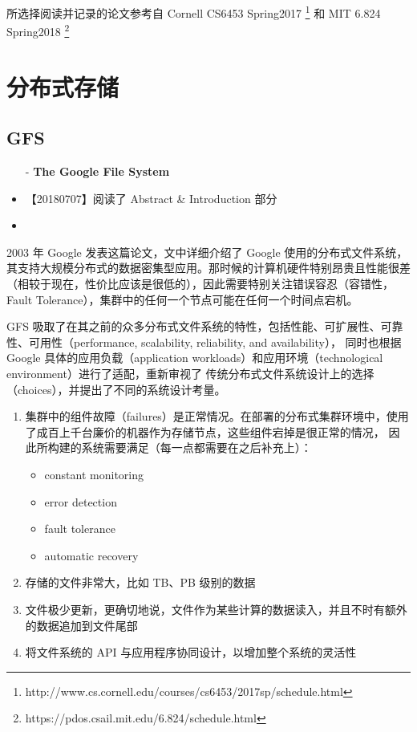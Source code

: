所选择阅读并记录的论文参考自 Cornell CS6453 Spring2017%
\footnote{http://www.cs.cornell.edu/courses/cs6453/2017sp/schedule.html}%
和 MIT 6.824 Spring2018%
\footnote{https://pdos.csail.mit.edu/6.824/schedule.html}%

%
%


\section{分布式存储}\label{sec:papers:storage}

\subsection{GFS}\label{paper:gfs}

\begin{itemize}
	\item [-] \textbf{The Google File System}
\end{itemize}

\begin{itemize}
	\item 【20180707】阅读了 Abstract \& Introduction 部分
	\item 
\end{itemize}

2003 年 Google 发表这篇论文，文中详细介绍了 Google 使用的分布式文件系统，其支持大规模分布式的数据密集型应用。那时候的计算机硬件特别昂贵且性能很差
（相较于现在，性价比应该是很低的），因此需要特别关注错误容忍（容错性，Fault Tolerance），集群中的任何一个节点可能在任何一个时间点宕机。

GFS 吸取了在其之前的众多分布式文件系统的特性，包括性能、可扩展性、可靠性、可用性（performance, scalability, reliability, and availability），
同时也根据 Google 具体的应用负载（application workloads）和应用环境（technological environment）进行了适配，重新审视了
传统分布式文件系统设计上的选择（choices），并提出了不同的系统设计考量。
\begin{enumerate}
	\item 集群中的组件故障（failures）是正常情况。在部署的分布式集群环境中，使用了成百上千台廉价的机器作为存储节点，这些组件宕掉是很正常的情况，
	因此所构建的系统需要满足（每一点都需要在之后补充上）： %
	\begin{itemize}
		\item constant monitoring
		\item error detection
		\item fault tolerance
		\item automatic recovery
	\end{itemize}
	\item 存储的文件非常大，比如 TB、PB 级别的数据
	\item 文件极少更新，更确切地说，文件作为某些计算的数据读入，并且不时有额外的数据追加到文件尾部
	\item 将文件系统的 API 与应用程序协同设计，以增加整个系统的灵活性
\end{enumerate}

